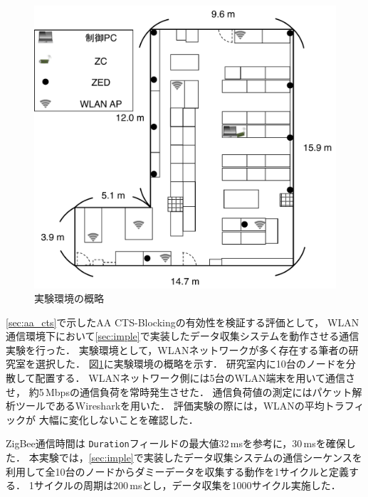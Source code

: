 \documentclass[12pt]{jreport}
\begin{document}
\begin{figure}[bt]
 \centering
 \includegraphics[width=\columnwidth]{figure/fukuda_lab.pdf}
 \caption{実験環境の概略}
 \label{fig:fukuda_lab}
\end{figure}

\ref{sec:aa_cts}で示したAA CTS-Blockingの有効性を検証する評価として，
WLAN通信環境下において\ref{sec:imple}で実装したデータ収集システムを動作させる通信実験を行った．
実験環境として，WLANネットワークが多く存在する筆者の研究室を選択した．
図\ref{fig:fukuda_lab}に実験環境の概略を示す．
研究室内に10台のノードを分散して配置する．
WLANネットワーク側には5台のWLAN端末を用いて通信させ，
約5\,Mbpsの通信負荷を常時発生させた．
通信負荷値の測定にはパケット解析ツールであるWiresharkを用いた．
評価実験の際には，WLANの平均トラフィックが
大幅に変化しないことを確認した．

ZigBee通信時間は
\texttt{Duration}フィールドの最大値32\,msを参考に，30\,msを確保した．
本実験では，\ref{sec:imple}で実装したデータ収集システムの通信シーケンスを
利用して全10台のノードからダミーデータを収集する動作を1サイクルと定義する．
1サイクルの周期は200\,msとし，データ収集を1000サイクル実施した．%
\end{document}
